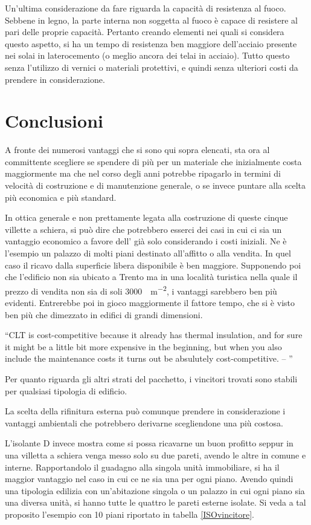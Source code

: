 Un'ultima considerazione da fare riguarda la capacità di resistenza al fuoco. 
Sebbene in legno, la parte interna non soggetta al fuoco è capace di resistere al pari delle proprie capacità. 
Pertanto creando elementi nei quali si considera questo aspetto, si ha un tempo di resistenza ben maggiore dell'acciaio presente nei solai in laterocemento (o meglio ancora dei telai in acciaio). 
Tutto questo senza l'utilizzo di vernici o materiali protettivi, e quindi senza ulteriori costi da prendere in considerazione.
%
\section{Conclusioni}
A fronte dei numerosi vantaggi che si sono qui sopra elencati, sta ora al committente scegliere se spendere di più per un materiale che inizialmente costa maggiormente ma che nel corso degli anni potrebbe ripagarlo in termini di velocità di costruzione e di manutenzione generale, o se invece puntare alla scelta più economica e più standard.

In ottica generale e non prettamente legata alla costruzione di queste cinque villette a schiera, si può dire che potrebbero esserci dei casi in cui ci sia un vantaggio economico a favore dell'\xlam{} già solo considerando i costi iniziali. 
Ne è l'esempio un palazzo di molti piani destinato all'affitto o alla vendita.
In quel caso il ricavo dalla superficie libera disponibile è ben maggiore.
Supponendo poi che l'edificio non sia ubicato a Trento ma in una località turistica nella quale il prezzo di vendita non sia di soli \SI{3000}{\teuro \per \square\metre}, i vantaggi sarebbero ben più evidenti.
Entrerebbe poi in gioco maggiormente il fattore tempo, che si è visto ben più che dimezzato in edifici di grandi dimensioni.


\vspace{1cm}
\noindent \enquote{CLT is cost-competitive because it already has thermal insulation, \omissis{} and for sure it might be a little bit more expensive in the beginning, but when you also include the maintenance costs it turns out be absulutely cost-competitive. -- \textcite{mallo_outlook_2014}}

\vspace{1cm}
Per quanto riguarda gli altri strati del pacchetto, i vincitori trovati sono stabili per qualsiasi tipologia di edificio.

La scelta della rifinitura esterna può comunque prendere in considerazione i vantaggi ambientali che potrebbero derivarne scegliendone una più costosa.

L'isolante D invece mostra come si possa ricavarne un buon profitto seppur in una villetta a schiera venga messo solo su due pareti, avendo le altre in comune e interne. 
Rapportandolo il guadagno alla singola unità immobiliare, si ha il maggior vantaggio nel caso in cui ce ne sia una per ogni piano. 
Avendo quindi una tipologia edilizia con un'abitazione singola o un palazzo in cui ogni piano sia una diversa unità, si hanno tutte le quattro le pareti esterne isolate. 
Si veda a tal proposito l'esempio con 10 piani riportato in tabella \ref{ISOvincitore}.
